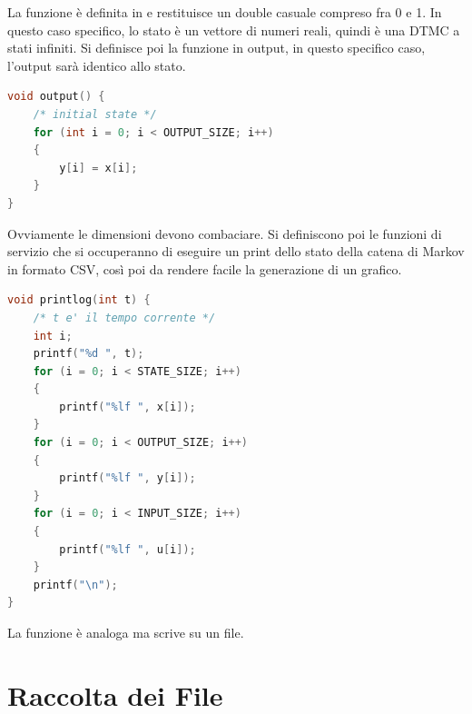 \documentclass[10pt, letterpaper]{report}
\begin{document}
La funzione  è definita in  e restituisce un double casuale compreso fra 0 e 1. In questo caso specifico, lo stato è un vettore di numeri reali, quindi è una DTMC a stati infiniti. Si definisce poi la funzione in output, in questo specifico caso, l'output sarà identico allo stato.
\begin{lstlisting}[style=CppStyle,language=C++]
void output() {
    /* initial state */
    for (int i = 0; i < OUTPUT_SIZE; i++)
    {
        y[i] = x[i];
    }
}
\end{lstlisting}
Ovviamente le dimensioni devono combaciare. Si definiscono poi le funzioni di servizio che 
si occuperanno di eseguire un print dello stato della catena di Markov in formato CSV, così poi 
da rendere facile la generazione di un grafico.
\begin{lstlisting}[style=CppStyle,language=C++]
void printlog(int t) {
    /* t e' il tempo corrente */
    int i;
    printf("%d ", t);
    for (i = 0; i < STATE_SIZE; i++)
    {
        printf("%lf ", x[i]);
    }
    for (i = 0; i < OUTPUT_SIZE; i++)
    {
        printf("%lf ", y[i]);
    }
    for (i = 0; i < INPUT_SIZE; i++)
    {
        printf("%lf ", u[i]);
    }
    printf("\n");
} 
\end{lstlisting}
La funzione  è analoga ma scrive su un file.
\\











\newpage 
\section{Raccolta dei File}
\end{document}
